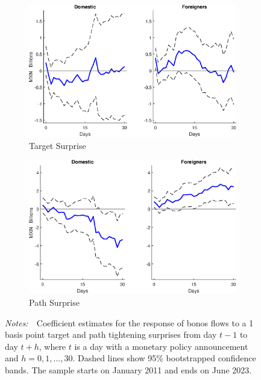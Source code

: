 \documentclass[a4paper, 12pt]{article}
\newcommand{\figtext}[1]{
	\vspace{-1ex}
	\captionsetup{justification=justified,font=footnotesize}
	\caption*{#1}
}
\newcommand{\fignotes}[1]{\figtext{\emph{Notes:~}~#1}}
\providecommand{\lastobsflwbdm}{June 2023}
\providecommand{\idxh}{h}
\begin{document}
\begin{appendices}
	\begin{figure}
		\caption{Bonos Flow Response to Target and Path Surprises by Investor Residence} \label{fig:LPBonosVACateg1}
		\begin{center}
			\begin{minipage}{\linewidth}
				\begin{center}
					\begin{subfigure}[b]{0.475\textwidth}
						\centering
						\includegraphics[width=\textwidth]{../Figures/Target11BonosVACateg1.eps}
						\caption[]{{\small Target Surprise}} \label{subfig:Target11BonosVACateg1}
					\end{subfigure}
					\hfill
					\begin{subfigure}[b]{0.475\textwidth}  
						\centering 
						\includegraphics[width=\textwidth]{../Figures/Path11BonosVACateg1.eps}
						\caption[]{{\small Path Surprise}} \label{subfig:Path11BonosVACateg1}
					\end{subfigure}
				\end{center}
				\fignotes{Coefficient estimates for the response of bonos flows to a 1 basis point target and path tightening surprises from day \(t - 1\) to day \(t + \idxh\), where \(t\) is a day with a monetary policy announcement and \(\idxh = 0, 1, \ldots, 30\). Dashed lines show 95\% bootstrapped confidence bands. The sample starts on January 2011 and ends on \lastobsflwbdm.}
			\end{minipage} 
		\end{center}
	\end{figure}
	

\end{appendices}
\end{document}
